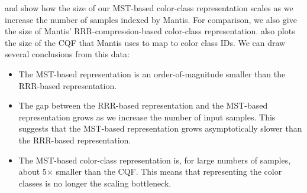  and  show how the size of our
MST-based color-class representation scales as we increase the number
of samples indexed by Mantis.  For comparison, we also give the size
of Mantis' RRR-compression-based color-class representation.
 also plots the size of the CQF that Mantis uses to
map \kmers to color class IDs. We can draw several conclusions from this data:
\begin{itemize}
    \item {The MST-based representation is an order-of-magnitude
    smaller than the RRR-based representation.}
    \item {The gap between the RRR-based representation and the
    MST-based representation grows as we increase the number of input
    samples.}  This suggests that the MST-based representation
    grows asymptotically slower than the RRR-based representation.
    \item {The MST-based color-class representation is, for large
    numbers of samples, about 5$\times$ smaller than the CQF.}  This
    means that representing the color classes is no longer the scaling
    bottleneck.
\end{itemize}

